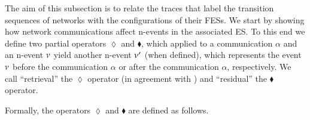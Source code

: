  The aim of this subsection is to relate the traces that label
the transition sequences of networks with the configurations of their
FESs.  We start by showing how network communications affect
n-events in the associated ES.  To this end  we define two
partial operators $\lozenge$ and $\blacklozenge$, which applied to a
communication $\alpha$ and an n-event $\nu$ yield another n-event
$\nu'$ (when defined), which represents the event $\nu$ before
the communication $\alpha$ or after the communication $\alpha$,
respectively. We call ``retrieval'' the $\lozenge$ operator (in
agreement with ) and ``residual'' the
$\blacklozenge$ operator.


Formally, the operators $\lozenge$ and $\blacklozenge$ are defined as follows. 


